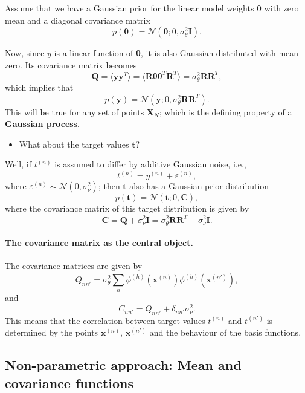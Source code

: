 \documentclass[%
oneside,                 %
final,                   %
10pt]{article}
\begin{document}
Assume that we have a Gaussian prior for the linear model weights $\boldsymbol{\theta}$ with zero mean and a diagonal covariance matrix
\[
p(\boldsymbol{\theta}) = \mathcal{N} \left( \boldsymbol{\theta}; 0, \sigma_\theta^2 \boldsymbol{I} \right).
\]

Now, since $y$ is a linear function of $\boldsymbol{\theta}$, it is also Gaussian distributed with mean zero. Its covariance matrix becomes
\[
\boldsymbol{Q} = \langle \boldsymbol{y} \boldsymbol{y}^T \rangle = \langle \boldsymbol{R} \boldsymbol{\theta} \boldsymbol{\theta}^T \boldsymbol{R}^T \rangle
= \sigma_\theta^2 \boldsymbol{R} \boldsymbol{R}^T,
\]
which implies that
\[
p(\boldsymbol{y}) = \mathcal{N} \left( \boldsymbol{y}; 0, \sigma_\theta^2 \boldsymbol{R} \boldsymbol{R}^T \right).
\]
This will be true for any set of points $\boldsymbol{X}_N$; which is the defining property of a \textbf{Gaussian process}.

\begin{itemize}
\item What about the target values $\boldsymbol{t}$?
\end{itemize}

\noindent
Well, if $t^{(n)}$ is assumed to differ by additive Gaussian noise, i.e., 
\[
t^{(n)} = y^{(n)} + \varepsilon^{(n)}, 
\]
where $\varepsilon^{(n)} \sim \mathcal{N} \left( 0, \sigma_\nu^2 \right)$; then $\boldsymbol{t}$ also has a Gaussian prior distribution
\[
p(\boldsymbol{t}) = \mathcal{N} \left( \boldsymbol{t}; 0, \boldsymbol{C} \right),
\]
where the covariance matrix of this target distribution is given by
\[
\boldsymbol{C} = \boldsymbol{Q} + \sigma_\nu^2 \boldsymbol{I} = \sigma_\theta^2 \boldsymbol{R} \boldsymbol{R}^T + \sigma_\nu^2 \boldsymbol{I}.
\]

\paragraph{The covariance matrix as the central object.}
The covariance matrices are given by
\[
Q_{nn'} = \sigma_\theta^2 \sum_h \phi^{(h)} \left( \boldsymbol{x}^{(n)} \right) \phi^{(h)} \left( \boldsymbol{x}^{(n')} \right),
\]
and
\[
C_{nn'} = Q_{nn'} + \delta_{nn'} \sigma_\nu^2.
\]
This means that the correlation between target values $t^{(n)}$ and $t^{(n')}$ is determined by the points $\boldsymbol{x}^{(n)}$, $\boldsymbol{x}^{(n')}$ and the behaviour of the basis functions.
\subsection{Non-parametric approach: Mean and covariance functions}
\end{document}
